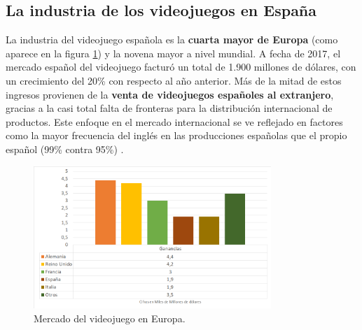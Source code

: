 \subsection{La industria de los videojuegos en España}
La industria del videojuego española es la \textbf{cuarta mayor de Europa} (como aparece en la figura \ref{distribucion-mercado-europa}) y la novena mayor a nivel mundial. A fecha de 2017, el mercado español del videojuego facturó un total de 1.900 millones de dólares, con un crecimiento del 20\% con respecto al año anterior. Más de la mitad de estos ingresos provienen de la \textbf{venta de videojuegos españoles al extranjero}, gracias a la casi total falta de fronteras para la distribución internacional de productos. Este enfoque en el mercado internacional se ve reflejado en factores como la mayor frecuencia del inglés en las producciones españolas que el propio español (99\% contra 95\%) \cite{libro_blanco}.
\begin{figure}[!t]
    \centering
    \includegraphics[width=0.8\textwidth]{images/estadodelarte/mercado/distribucion-mercado-europa}
    \caption{Mercado del videojuego en Europa.}
    \label{distribucion-mercado-europa}
\end{figure}

